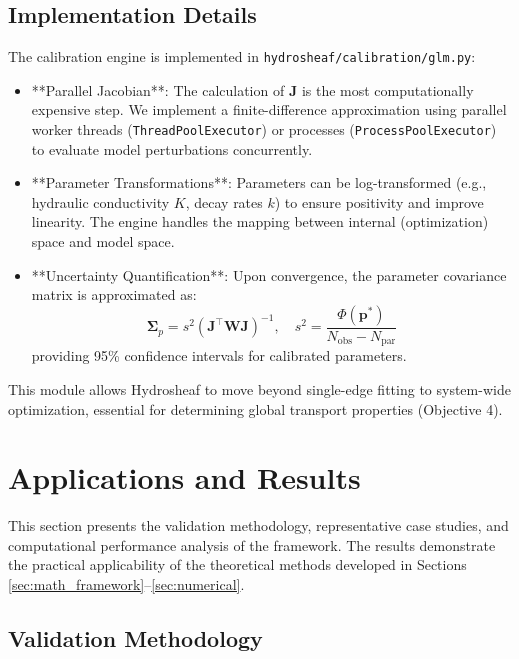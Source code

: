 \documentclass[12pt,a4paper]{article}
\theoremstyle{plain}
\theoremstyle{definition}
\theoremstyle{remark}
\begin{document}
\subsection{Implementation Details}

The calibration engine is implemented in \texttt{hydrosheaf/calibration/glm.py}:

\begin{itemize}
	\item **Parallel Jacobian**: The calculation of $\mathbf{J}$ is the most computationally expensive step. We implement a finite-difference approximation using parallel worker threads (\texttt{ThreadPoolExecutor}) or processes (\texttt{ProcessPoolExecutor}) to evaluate model perturbations concurrently.
	\item **Parameter Transformations**: Parameters can be log-transformed (e.g., hydraulic conductivity $K$, decay rates $k$) to ensure positivity and improve linearity. The engine handles the mapping between internal (optimization) space and model space.
	\item **Uncertainty Quantification**: Upon convergence, the parameter covariance matrix is approximated as:
	      \begin{equation}
		      \boldsymbol{\Sigma}_p = s^2 (\mathbf{J}^\top \mathbf{W} \mathbf{J})^{-1}, \quad s^2 = \frac{\Phi(\mathbf{p}^*)}{N_{\text{obs}} - N_{\text{par}}}
	      \end{equation}
	      providing 95\% confidence intervals for calibrated parameters.
\end{itemize}

This module allows Hydrosheaf to move beyond single-edge fitting to system-wide optimization, essential for determining global transport properties (Objective 4).

\section{Applications and Results}\label{sec:results}

This section presents the validation methodology, representative case studies, and computational performance analysis of the framework. The results demonstrate the practical applicability of the theoretical methods developed in Sections \ref{sec:math_framework}--\ref{sec:numerical}.

\subsection{Validation Methodology}
\end{document}
